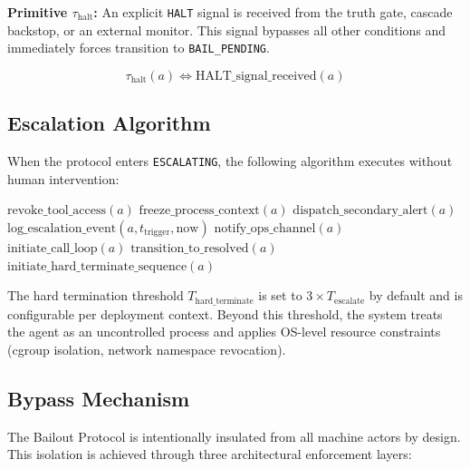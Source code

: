 \bigskip
\noindent\textbf{Primitive $\tau_{\text{halt}}$:} An explicit \texttt{HALT} signal is received from the truth gate, cascade backstop, or an external monitor. This signal bypasses all other conditions and immediately forces transition to \texttt{BAIL\_PENDING}.

\[
\tau_{\text{halt}}(a) \iff \text{HALT\_signal\_received}(a)
\]

\subsection{Escalation Algorithm}

When the protocol enters \texttt{ESCALATING}, the following algorithm executes without human intervention:

\begin{algorithm}
\caption{Bailout Escalation Procedure}
\begin{algorithmic}[1]
\State $\text{revoke\_tool\_access}(a)$ 
\State $\text{freeze\_process\_context}(a)$ 
\State $\text{dispatch\_secondary\_alert}(a)$ 
\State $\text{log\_escalation\_event}(a, t_{\text{trigger}}, \text{now})$ 
\State $\text{notify\_ops\_channel}(a)$ 
\State $\text{initiate\_call\_loop}(a)$ 
    \State $\text{transition\_to\_resolved}(a)$
\Else
    \State $\text{initiate\_hard\_terminate\_sequence}(a)$ 
\EndIf
\end{algorithmic}
\end{algorithm}

The hard termination threshold $T_{\text{hard\_terminate}}$ is set to $3 \times T_{\text{escalate}}$ by default and is configurable per deployment context. Beyond this threshold, the system treats the agent as an uncontrolled process and applies OS-level resource constraints (cgroup isolation, network namespace revocation).

\subsection{Bypass Mechanism}

The Bailout Protocol is intentionally insulated from all machine actors by design. This isolation is achieved through three architectural enforcement layers:

